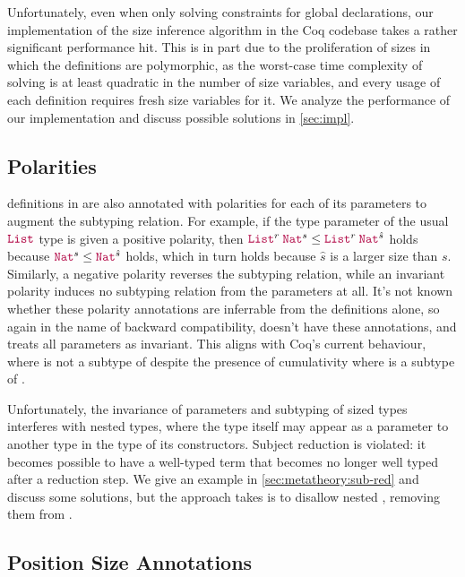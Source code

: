 Unfortunately, even when only solving constraints for global declarations,
our implementation of the size inference algorithm in the Coq codebase takes a rather significant performance hit.
This is in part due to the proliferation of sizes in which the definitions are polymorphic,
as the worst-case time complexity of solving is at least quadratic in the number of size variables,
and every usage of each definition requires fresh size variables for it.
We analyze the performance of our implementation and discuss possible solutions in \autoref{sec:impl}.

\subsection{Polarities}

\Coinductive definitions in \CIChatminus are also annotated with polarities for each of its parameters to augment the subtyping relation.
For example, if the type parameter of the usual $\List$ type is given a positive polarity,
then $\app{\List^r}{\Nat^s} \leq \app{\List^r}{\Nat^{\hat{s}}}$ holds
because $\Nat^s \leq \Nat^{\hat{s}}$ holds,
which in turn holds because $\hat{s}$ is a larger size than $s$.
Similarly, a negative polarity reverses the subtyping relation,
while an invariant polarity induces no subtyping relation from the parameters at all.
It's not known whether these polarity annotations are inferrable from the \coinductive definitions alone,
so again in the name of backward compatibility, \lang doesn't have these annotations,
and treats all parameters as invariant.
This aligns with Coq's current behaviour, where  is not a subtype of 
despite the presence of cumulativity where  is a subtype of .

Unfortunately, the invariance of parameters and subtyping of sized \coinductive types interferes with nested \coinductive types,
where the type itself may appear as a parameter to another type in the type of its constructors.
Subject reduction is violated: it becomes possible to have a well-typed term that becomes no longer well typed after a reduction step.
We give an example in \autoref{sec:metatheory:sub-red} and discuss some solutions,
but the approach \lang takes is to disallow nested \coinductives,
removing them from \CIChat.

\iffalse
\subsection{Position Size Annotations}


